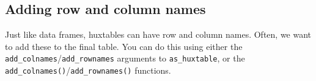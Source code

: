 \documentclass[]{article}
\newenvironment{Shaded}{\begin{snugshade}}{\end{snugshade}}
\newcommand{\DataTypeTok}[1]{\textcolor[rgb]{0.13,0.29,0.53}{#1}}
\newcommand{\DecValTok}[1]{\textcolor[rgb]{0.00,0.00,0.81}{#1}}
\newcommand{\KeywordTok}[1]{\textcolor[rgb]{0.13,0.29,0.53}{\textbf{#1}}}
\newcommand{\NormalTok}[1]{#1}
\newcommand{\OperatorTok}[1]{\textcolor[rgb]{0.81,0.36,0.00}{\textbf{#1}}}
\newcommand{\StringTok}[1]{\textcolor[rgb]{0.31,0.60,0.02}{#1}}
\begin{document}
\FloatBarrier

\hypertarget{adding-row-and-column-names}{%
\subsection{Adding row and column
names}\label{adding-row-and-column-names}}

Just like data frames, huxtables can have row and column names. Often,
we want to add these to the final table. You can do this using either
the \texttt{add\_colnames}/\texttt{add\_rownames} arguments to
\texttt{as\_huxtable}, or the
\texttt{add\_colnames()}/\texttt{add\_rownames()} functions.

\begin{Shaded}
\end{Shaded}

 
  \providecommand{\huxb}[2]{\arrayrulecolor[RGB]{#1}\global\arrayrulewidth=#2pt}
  \providecommand{\huxvb}[2]{\color[RGB]{#1}\vrule width #2pt}
  \providecommand{\huxtpad}[1]{\rule{0pt}{\baselineskip+#1}}
  \providecommand{\huxbpad}[1]{\rule[-#1]{0pt}{#1}}
\end{document}
